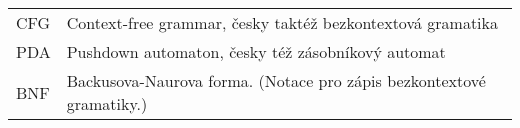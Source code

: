 
\seznamzkr

\begin{tabular}{ll}
	CFG & Context-free grammar, česky taktéž bezkontextová gramatika \\
	PDA & Pushdown automaton, česky též zásobníkový automat \\
	BNF & Backusova-Naurova forma. (Notace pro zápis bezkontextové gramatiky.) \\
\end{tabular}

